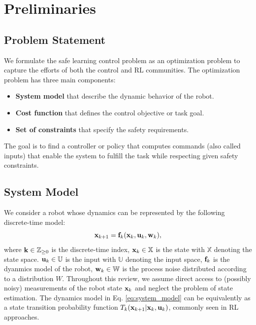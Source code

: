 \documentclass{article}
\begin{document}

\section{Preliminaries}

\subsection{Problem Statement}

We formulate the safe learning control problem as an optimization problem to capture the efforts of both the control and RL communities.
The optimization problem has three main components:
\begin{itemize}
    \item \textbf{System model} that describe the dynamic behavior of the robot.
    \item \textbf{Cost function} that defines the control objective or task goal.
    \item \textbf{Set of constraints} that specify the safety requirements.
\end{itemize}
The goal is to find a controller or policy that computes commands (also called inputs) that enable the system to fulfill the task while respecting given safety constraints.

\subsection{System Model}

We consider a robot whose dynamics can be represented by the following discrete-time model:
\begin{equation} \label{eq:system_model}
    \mathbf{x}_{k + 1} = \mathbf{f}_k(\mathbf{x}_k, \mathbf{u}_k, \mathbf{w}_k),
\end{equation}
where $\mathbf{k} \in \mathbb{Z}_{\geq 0}$ is the discrete-time index, $\mathbf{x}_k \in \mathbb{X}$ is the state with $\mathbb{X}$ denoting the state space.
$\mathbf{u}_k \in \mathbb{U}$ is the input with $\mathbb{U}$ denoting the input space, $\mathbf{f}_k$ is the dyanmics model of the robot, $\mathbf{w}_k \in \mathbb{W}$ is the process noise distributed according to a distribution $W$.
Throughout this review, we assume direct access to (possibly noisy) measurements of the robot state $\mathbf{x}_k$ and neglect the problem of state estimation.
The dynamics model in Eq. \eqref{eq:system_model} can be equivalently as a state transition probability function $T_k(\mathbf{x}_{k + 1}|\mathbf{x}_k, \mathbf{u}_k)$, commonly seen in RL approaches.
\end{document}
